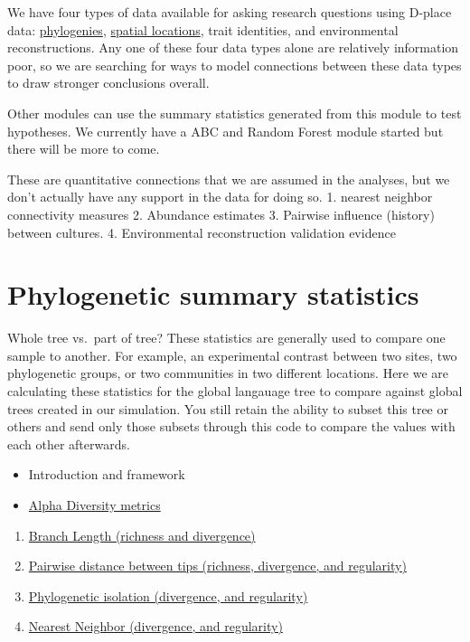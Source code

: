 \documentclass[]{book}
\providecommand{\tightlist}{%
  \setlength{\itemsep}{0pt}\setlength{\parskip}{0pt}}
\theoremstyle{definition}
\theoremstyle{definition}
\theoremstyle{remark}
\begin{document}
We have four types of data available for asking research questions using
D-place data:
\protect\hyperlink{phylogenetic-summary-statistics}{phylogenies},
\protect\hyperlink{spatial-locations}{spatial locations}, trait
identities, and environmental reconstructions. Any one of these four
data types alone are relatively information poor, so we are searching
for ways to model connections between these data types to draw stronger
conclusions overall.

Other modules can use the summary statistics generated from this module
to test hypotheses. We currently have a ABC and Random Forest module
started but there will be more to come.

These are quantitative connections that we are assumed in the analyses,
but we don't actually have any support in the data for doing so. 1.
nearest neighbor connectivity measures 2. Abundance estimates 3.
Pairwise influence (history) between cultures. 4. Environmental
reconstruction validation evidence

\hypertarget{phylogenetic-summary-statistics}{\section{Phylogenetic
summary statistics}\label{phylogenetic-summary-statistics}}

Whole tree vs.~part of tree? These statistics are generally used to
compare one sample to another. For example, an experimental contrast
between two sites, two phylogenetic groups, or two communities in two
different locations. Here we are calculating these statistics for the
global langauage tree to compare against global trees created in our
simulation. You still retain the ability to subset this tree or others
and send only those subsets through this code to compare the values with
each other afterwards.

\begin{itemize}
\tightlist
\item
  Introduction and framework
\item
  \protect\hyperlink{alpha-diversity-metrics}{Alpha Diversity metrics}
\end{itemize}

\begin{enumerate}
\def\labelenumi{\arabic{enumi}.}
\tightlist
\item
  \protect\hyperlink{branch-lengths}{Branch Length (richness and
  divergence)}
\item
  \protect\hyperlink{pairwise-distance-between-tips}{Pairwise distance
  between tips (richness, divergence, and regularity)}
\item
  \protect\hyperlink{phylogenetic-isolation}{Phylogenetic isolation
  (divergence, and regularity)}
\item
  \protect\hyperlink{nearest-phylogenetic-neighbor}{Nearest Neighbor
  (divergence, and regularity)}
\end{enumerate}
\end{document}
